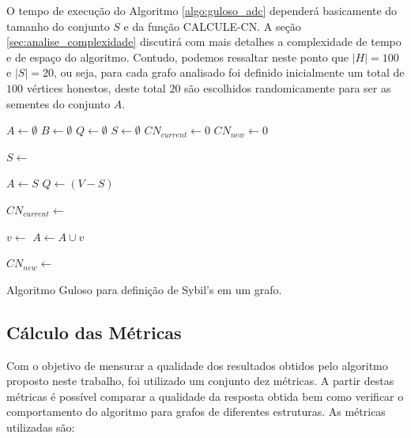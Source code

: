 \documentclass[12pt]{article}
\begin{document}
O tempo de execução do Algoritmo \ref{algo:guloso_adc} dependerá basicamente do tamanho do conjunto $S$ e da função \textsc{CALCULE-CN}. A seção \ref{sec:analise_complexidade} discutirá com mais detalhes a complexidade de tempo e de espaço do algoritmo. Contudo, podemos ressaltar neste ponto que $|H| = 100$ e $|S| = 20$, ou seja, para cada grafo analisado foi definido inicialmente um total de $100$ vértices honestos, deste total $20$ são escolhidos randomicamente para ser as sementes do conjunto $A$.


\begin{algorithm}
\DontPrintSemicolon %

$A \gets \emptyset$\;
$B \gets \emptyset$\;
$Q \gets \emptyset$\;
$S \gets \emptyset$\;
$CN_{current} \gets 0$\;
$CN_{new} \gets 0$\;

$S \gets$ \;

$A \gets S$\;
$Q \gets (V-S)$\;

$CN_{current} \gets$ \;


 {

	$v \gets$ \;
	$A \gets A \cup v$\;
	
	$CN_{new} \gets$ \;
	
    
}
\;
\caption{\sc Algoritmo Guloso para definição de Sybil's em um grafo.}
\label{algo:guloso_adc}
\end{algorithm}

\subsection{Cálculo das Métricas}
\label{subsec:metricas}

Com o objetivo de mensurar a qualidade dos resultados obtidos pelo algoritmo proposto neste trabalho, foi utilizado um conjunto dez métricas. A partir destas métricas é possível comparar a qualidade da resposta obtida bem como verificar o comportamento do algoritmo para grafos de diferentes estruturas. As métricas utilizadas são:
\end{document}
